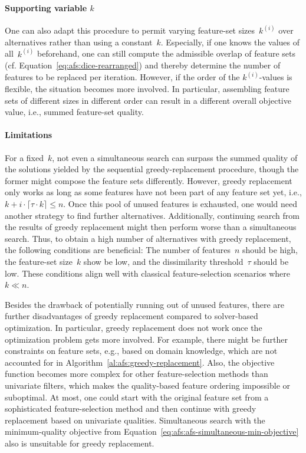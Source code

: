 \documentclass{article}
\theoremstyle{definition}
\begin{document}
\paragraph{Supporting variable $k$}

One can also adapt this procedure to permit varying feature-set sizes~$k^{(i)}$ over alternatives rather than using a constant~$k$.
Especially, if one knows the values of all~$k^{(i)}$ beforehand, one can still compute the admissible overlap of feature sets (cf. Equation~\ref{eq:afs:dice-rearranged}) and thereby determine the number of features to be replaced per iteration.
However, if the order of the $k^{(i)}$-values is flexible, the situation becomes more involved.
In particular, assembling feature sets of different sizes in different order can result in a different overall objective value, i.e., summed feature-set quality.

\paragraph{Limitations}

For a fixed~$k$, not even a simultaneous search can surpass the summed quality of the solutions yielded by the sequential greedy-replacement procedure, though the former might compose the feature sets differently.
However, greedy replacement only works as long as some features have not been part of any feature set yet, i.e., $k + i \cdot \lceil \tau \cdot k \rceil \leq n$.
Once this pool of unused features is exhausted, one would need another strategy to find further alternatives.
Additionally, continuing search from the results of greedy replacement might then perform worse than a simultaneous search.
Thus, to obtain a high number of alternatives with greedy replacement, the following conditions are beneficial:
The number of features~$n$ should be high, the feature-set size~$k$ show be low, and the dissimilarity threshold~$\tau$ should be low.
These conditions align well with classical feature-selection scenarios where~$k \ll n$.

Besides the drawback of potentially running out of unused features, there are further disadvantages of greedy replacement compared to solver-based optimization.
In particular, greedy replacement does not work once the optimization problem gets more involved.
For example, there might be further constraints on feature sets, e.g., based on domain knowledge, which are not accounted for in Algorithm~\ref{al:afs:greedy-replacement}.
Also, the objective function becomes more complex for other feature-selection methods than univariate filters, which makes the quality-based feature ordering impossible or suboptimal.
At most, one could start with the original feature set from a sophisticated feature-selection method and then continue with greedy replacement based on univariate qualities.
Simultaneous search with the minimum-quality objective from Equation~\ref{eq:afs:afs-simultaneous-min-objective} also is unsuitable for greedy replacement.
\end{document}
